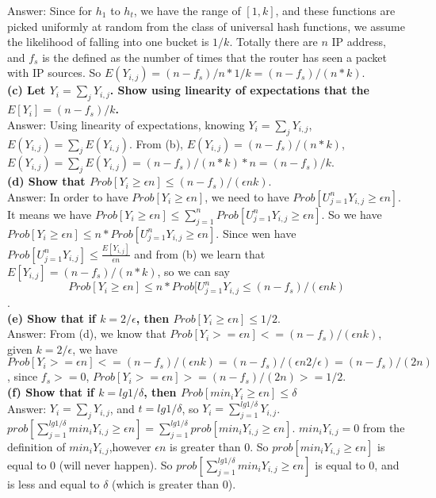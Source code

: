\documentclass{article}
\begin{document}
Answer: Since for $h_1$ to $h_t$, we have the range of $[1,k]$, and these functions are picked uniformly at random from the class of universal hash functions, we assume the likelihood of falling into one bucket is $1/k$. Totally there are $n$ IP address, and $f_s$ is the defined as the number of times that the router has seen a packet with IP sources. So $E(Y_{i,j}) =(n-f_s)/n * 1/k = (n-f_s)/(n*k)$.\\ \newline
\textbf{(c) Let $Y_i = \sum_jY_{i,j}$. Show using linearity of expectations that the $E[Y_i] = (n - f_s)/k$.} \\ \newline
Answer: Using linearity of expectations, knowing $Y_i = \sum_{j} Y_{i,j}$, $E(Y_{i,j}) =  \sum_{j} E(Y_{i,j})$. From (b), $E(Y_{i,j}) = (n-f_s)/(n*k)$,  $E(Y_{i,j}) =  \sum_{j} E(Y_{i,j}) =(n-f_s)/(n*k) * n =  (n-f_s)/k$.\\ \newline
\textbf{(d) Show that $Prob[Y_i \geq \epsilon n] \leq (n - f_s)/(\epsilon nk)$}. \\ \newline
Answer: In order to have $Prob[Y_i \geq \epsilon n]$, we need to have $Prob[U_{j=1}^{n}Y_{i,j}\geq \epsilon n]$. It means we have $Prob[Y_i \geq \epsilon n]\leq \sum_{j=1}^{n}Prob[U_{j=1}^{n}Y_{i,j}\geq \epsilon n]$. So we have $Prob[Y_i \geq \epsilon n]\leq n*Prob[U_{j=1}^{n}Y_{i,j}\geq \epsilon n]$. Since wen have $Prob[U_{j=1}^{n}Y_{i,j}] \leq \frac{E[Y_{i,j}]}{\epsilon n}$ and from (b) we learn that $E[Y_{i,j}] = (n - f_s)/(n*k)$, so we can say $$Prob[Y_i \geq \epsilon n]\leq n*Prob[U_{j=1}^{n}Y_{i,j} \leq (n - f_s)/(\epsilon nk)$$.\\ \newline
\textbf{(e) Show that if $k = 2/\epsilon$, then $Prob[Y_i \geq \epsilon n] \leq 1/2$}. \\ \newline
Answer: From (d), we know that $Prob[Y_i>=\epsilon n] <= (n-f_s)/(\epsilon nk)$, given $k = 2/\epsilon$, we have $Prob[Y_i>=\epsilon n] <= (n-f_s)/(\epsilon nk) = (n-f_s)/(\epsilon n 2/\epsilon) = (n-f_s)/(2n)$, since $f_s>=0$,  $Prob[Y_i>=\epsilon n] > = (n-f_s)/(2n) >=1/2$.\\ \newline
\textbf{(f) Show that if $k = lg1/\delta$, then $Prob[min_i Y_i \geq \epsilon n] \leq \delta$} \\ \newline
Answer: $Y_i = \sum_{j} Y_{i,j}$, and $t=lg1/\delta$, so $Y_i = \sum_{j=1}^{lg1/\delta} Y_{i,j}$. $prob[\sum_{j=1}^{lg1/\delta} min_i Y_{i,j} \geq \epsilon n] =  \sum_{j=1}^{lg1/\delta} prob[min_i Y_{i,j} \geq \epsilon n]$. $min_i Y_{i,j} = 0$ from the definition of $min_i Y_{i,j}$,however $\epsilon n$ is greater than 0. So $prob[min_i Y_{i,j} \geq \epsilon n]$ is equal to 0 (will never happen). So $prob[\sum_{j=1}^{lg1/\delta} min_i Y_{i,j} \geq \epsilon n] $ is equal to 0, and is less and equal to $\delta$ (which is greater than 0).   \\ \newline
\end{document}
